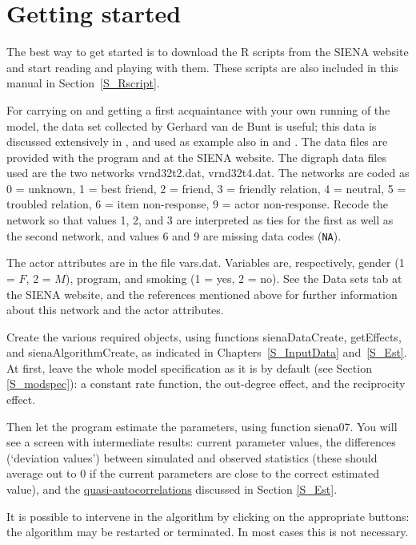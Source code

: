 \documentclass[a4paper,fleqn,11pt]{article}
\newcommand{\+}{\, + \,}
\newcommand{\sfn}[1]{\textsf{#1}}
\newcommand{\R}{{\sf R }}
\newcommand{\SI}{{\sf SIENA }}
\begin{document}
\newpage
\section{Getting started}
\label{S_getting}

The best way to get started is to download the \R scripts from the
\SI website and start reading and playing with them.
These scripts are also included in this manual in Section~\ref{S_Rscript}.

For carrying on and getting a first acquaintance with your own running
of the model, the data set collected by Gerhard van de Bunt
is useful; this data is discussed extensively in
\citet*{vanBunt99, vanBuntEA99},
and used as example also in \citet{Snijders01} and \citet{Snijders05}.
The data files are provided with the program
and at the \SI website. The digraph data files
used are the two networks {\sf vrnd32t2.dat}, {\sf vrnd32t4.dat}.
The networks are coded as 0 = unknown, 1 = best friend, 2 = friend,
3 = friendly relation, 4 = neutral, 5 = troubled relation, 6 = item
non-response, 9 = actor non-response.
Recode the network so that values 1, 2, and 3 are interpreted
as ties for the first as well as the second network, and values 6 and 9
are missing data codes (\texttt{NA}).

The actor attributes are in the file {\sf vars.dat}. Variables
are, respectively, gender (1 = $F$, 2 = $M$), program, and smoking
(1 = yes, 2 = no). See the \sfn{Data sets} tab at the
\SI website, and the references mentioned above for further
information about this network and the actor attributes.

Create the various required objects, using functions
\sfn{sienaDataCreate}, \sfn{getEffects}, and \sfn{sienaAlgorithmCreate},
as indicated in Chapters~\ref{S_InputData} and~\ref{S_Est}.
At first, leave the whole model specification as
it is by default (see Section \ref{S_modspec}):
a constant rate function, the out-degree effect, and
the reciprocity effect.

Then let the program estimate the parameters, using function \sfn{siena07}.
You will see a
screen with intermediate results: current parameter values, the
differences (`deviation values') between simulated and observed
statistics (these should average out to 0 if the current
parameters are close to the correct estimated value), and the
\hyperlink{T_quasiac}{quasi-autocorrelations} discussed in Section
\ref{S_Est}.

It is possible to intervene in the algorithm by clicking on the
appropriate buttons:
the algorithm may be restarted or terminated. In most cases
this is not necessary.
\end{document}
